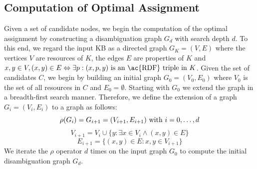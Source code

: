 \subsection{Computation of Optimal Assignment}

Given a set of candidate nodes, we begin the computation of the optimal assignment by constructing a disambiguation graph $G_d$ with search depth $d$.
To this end, we regard the input \ac{KB} as a directed graph $G_K = (V, E)$ where the vertices $V$ are resources of $K$, the edges $E$ are properties of $K$ and $x,y\in V, (x,y) \in E \Leftrightarrow \exists p : (x, p, y) \mbox{ is an \ac{RDF} triple in }K$.
Given the set of candidates $C$, we begin by building an initial graph $G_0 = (V_0, E_0)$ where $V_0$ is the set of all resources in $C$ and $E_0=\emptyset$. %
Starting with $G_0$ we extend the graph in a breadth-first search manner.
Therefore, we define the extension of a graph $G_i = (V_i, E_i)$ to a graph as follows:
\begin{equation}
\rho(G_i) = G_{i+1} = (V_{i+1}, E_{i+1}) \textnormal{ with } i=0, \ldots, d
\end{equation}
\begin{equation}
V_{i+1} = V_i \cup \{y : \exists x \in V_i \wedge (x, y) \in E\}
\end{equation}
\begin{equation}
E_{i+1} = \{(x,y) \in E: x, y \in V_{i+1}\}
\end{equation}
We iterate the $\rho$ operator $d$ times on the input graph $G_0$ to compute the initial disambiguation graph $G_d$.


